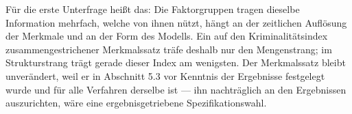 \documentclass[12pt,a4paper]{article}
\begin{document}
Für die erste Unterfrage heißt das: Die Faktorgruppen tragen dieselbe Information mehrfach, welche von ihnen nützt, hängt an der zeitlichen Auflösung der Merkmale und an der Form des Modells. Ein auf den Kriminalitätsindex zusammengestrichener Merkmalssatz träfe deshalb nur den Mengenstrang; im Strukturstrang trägt gerade dieser Index am wenigsten. Der Merkmalssatz bleibt unverändert, weil er in Abschnitt 5.3 vor Kenntnis der Ergebnisse festgelegt wurde und für alle Verfahren derselbe ist --- ihn nachträglich an den Ergebnissen auszurichten, wäre eine ergebnisgetriebene Spezifikationswahl.
%
%
%
%
\end{document}
